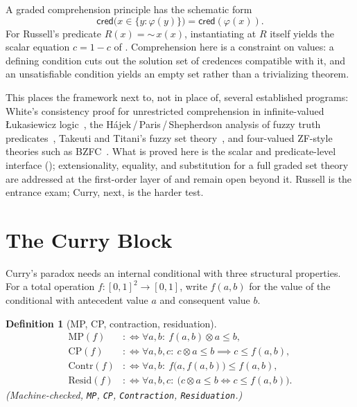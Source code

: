 \documentclass[11pt,a4paper]{article}
\newtheorem{definition}[theorem]{Definition}
\newcommand{\cred}{\mathsf{cred}}
\newcommand{\negc}{\mathord{\sim}}
\newcommand{\conjc}{\otimes}
\begin{document}
A graded comprehension principle has the schematic form
\[
  \cred\bigl(x \in \{y : \varphi(y)\}\bigr) = \cred(\varphi(x)).
\]
For Russell's predicate $R(x) = \negc\, x(x)$, instantiating at $R$
itself yields the scalar equation $c = 1 - c$ of .
Comprehension here is a constraint on values: a defining condition cuts
out the solution set of credences compatible with it, and an
unsatisfiable condition yields an empty set rather than a trivializing
theorem.

This places the framework next to, not in place of, several
established programs:
White's consistency proof for unrestricted comprehension in
infinite-valued \L ukasiewicz logic~\cite{white1979}, the
H\'ajek\,/\,Paris\,/\,Shepherdson analysis of fuzzy truth
predicates~\cite{hajek2000,hajek2000liar}, Takeuti and Titani's fuzzy
set theory~\cite{takeuti1984}, and four-valued ZF-style theories such
as BZFC~\cite{khomskii2024}.
What is proved here is the scalar and predicate-level interface
();
extensionality, equality, and substitution for a full graded set
theory are addressed at the first-order layer of  and
remain open beyond it.
Russell is the entrance exam; Curry, next, is the harder test.

\section{The Curry Block}
\label{sec:curry}

Curry's paradox needs an internal conditional with three structural
properties.
For a total operation $f : [0,1]^2 \to [0,1]$, write $f(a,b)$ for the
value of the conditional with antecedent value $a$ and consequent
value $b$.

\begin{definition}[MP, CP, contraction, residuation]
\label{def:mp-cp}
\begin{align*}
  \mathrm{MP}(f) &:\iff \forall a, b:\ f(a,b) \conjc a \leq b,\\
  \mathrm{CP}(f) &:\iff \forall a, b, c:\
    c \conjc a \leq b \implies c \leq f(a,b),\\
  \mathrm{Contr}(f) &:\iff \forall a, b:\
    f\bigl(a, f(a,b)\bigr) \leq f(a,b),\\
  \mathrm{Resid}(f) &:\iff \forall a, b, c:\
    \bigl(c \conjc a \leq b \iff c \leq f(a,b)\bigr).
\end{align*}
(Machine-checked, \texttt{MP}, \texttt{CP}, \texttt{Contraction},
\texttt{Residuation}.)
\end{definition}
\end{document}
